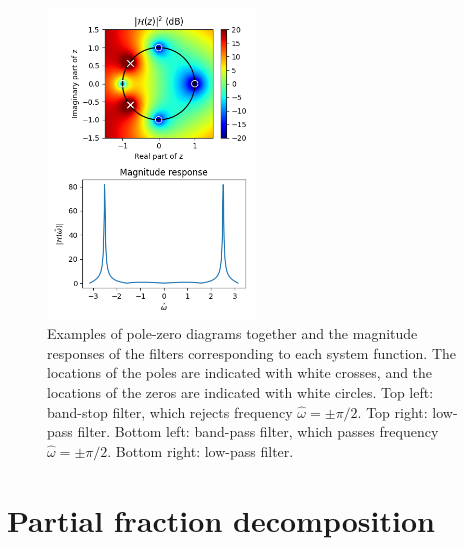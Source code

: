 \begin{figure}
\begin{center}
            \includegraphics[width=0.49\textwidth]{code/026_iir/ex8.png}
        \end{center}
        \caption{Examples of pole-zero diagrams together and the magnitude responses of the filters
            corresponding to each system function. The locations of the poles are indicated with white crosses,
            and the locations of the zeros are indicated with white circles.
            Top left: band-stop filter, which rejects frequency $\hat{\omega}=\pm\pi/2$.
            Top right: low-pass filter.
            Bottom left: band-pass filter, which passes frequency $\hat{\omega}=\pm \pi/2$.
            Bottom right: low-pass filter.}
        \label{fig:pz_examples2}
    \end{figure}
\fi

\section{Partial fraction decomposition}

